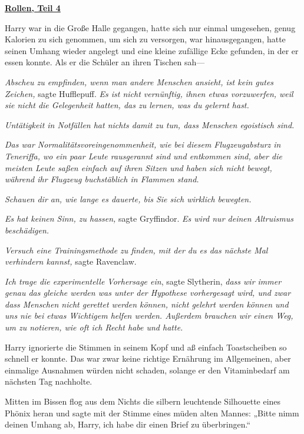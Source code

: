 

\hypertarget{rollen-teil-4}{%

\textbf{\uline{Rollen, Teil 4}}

Harry war in die Große Halle gegangen, hatte sich nur einmal umgesehen, genug Kalorien zu sich genommen, um sich zu versorgen, war hinausgegangen, hatte seinen Umhang wieder angelegt und eine kleine zufällige Ecke gefunden, in der er essen konnte. Als er die Schüler an ihren Tischen sah—

\emph{Abscheu zu empfinden, wenn man andere Menschen ansieht, ist kein gutes Zeichen,} sagte Hufflepuff. \emph{Es ist nicht vernünftig, ihnen etwas vorzuwerfen, weil sie nicht die Gelegenheit hatten, das zu lernen, was du gelernt hast.}

\emph{Untätigkeit in Notfällen hat nichts damit zu tun, dass Menschen egoistisch sind.}

\emph{Das war Normalitätsvoreingenommenheit, wie bei diesem Flugzeugabsturz in Teneriffa, wo ein paar Leute rausgerannt sind und entkommen sind, aber die meisten Leute saßen einfach auf ihren Sitzen und haben sich nicht bewegt, während ihr Flugzeug buchstäblich in Flammen stand.}

\emph{Schauen dir an, wie lange es dauerte, bis Sie sich wirklich bewegten.}

\emph{Es hat keinen Sinn, zu hassen,} sagte Gryffindor. \emph{Es wird nur deinen Altruismus beschädigen.}

\emph{Versuch eine Trainingsmethode zu finden, mit der du es das nächste Mal verhindern kannst,} sagte Ravenclaw.

\emph{Ich trage die experimentelle Vorhersage ein}, sagte Slytherin, \emph{dass wir immer genau das gleiche werden was unter der Hypothese vorhergesagt wird, und zwar dass Menschen nicht gerettet werden können, nicht gelehrt werden können und uns nie bei etwas Wichtigem helfen werden. Außerdem brauchen wir einen Weg, um zu notieren, wie oft ich Recht habe und hatte.}

Harry ignorierte die Stimmen in seinem Kopf und aß einfach Toastscheiben so schnell er konnte. Das war zwar keine richtige Ernährung im Allgemeinen, aber einmalige Ausnahmen würden nicht schaden, solange er den Vitaminbedarf am nächsten Tag nachholte.

Mitten im Bissen flog aus dem Nichts die silbern leuchtende Silhouette eines Phönix heran und sagte mit der Stimme eines müden alten Mannes: „Bitte nimm deinen Umhang ab, Harry, ich habe dir einen Brief zu überbringen.“

}
